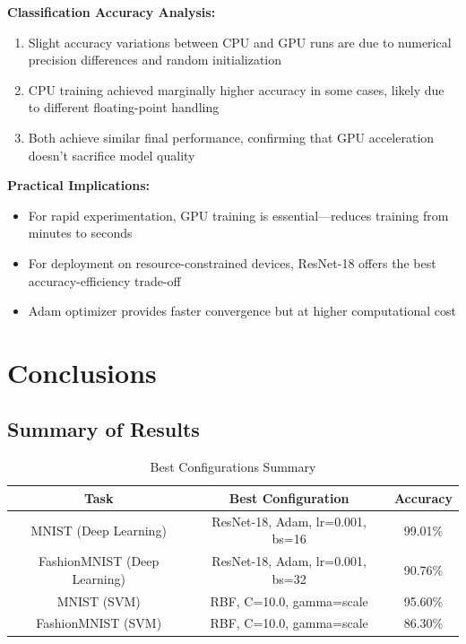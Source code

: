 \documentclass[11pt,a4paper]{article}
\begin{document}
\textbf{Classification Accuracy Analysis:}

\begin{enumerate}
    \item Slight accuracy variations between CPU and GPU runs are due to numerical precision differences and random initialization
    \item CPU training achieved marginally higher accuracy in some cases, likely due to different floating-point handling
    \item Both achieve similar final performance, confirming that GPU acceleration doesn't sacrifice model quality
\end{enumerate}

\textbf{Practical Implications:}

\begin{itemize}
    \item For rapid experimentation, GPU training is essential—reduces training from minutes to seconds
    \item For deployment on resource-constrained devices, ResNet-18 offers the best accuracy-efficiency trade-off
    \item Adam optimizer provides faster convergence but at higher computational cost
\end{itemize}

\section{Conclusions}

\subsection{Summary of Results}

\begin{table}[H]
\centering
\caption{Best Configurations Summary}
\begin{tabular}{|c|c|c|}
\hline
\textbf{Task} & \textbf{Best Configuration} & \textbf{Accuracy} \\
\hline
MNIST (Deep Learning) & ResNet-18, Adam, lr=0.001, bs=16 & 99.01\% \\
\hline
FashionMNIST (Deep Learning) & ResNet-18, Adam, lr=0.001, bs=32 & 90.76\% \\
\hline
MNIST (SVM) & RBF, C=10.0, gamma=scale & 95.60\% \\
\hline
FashionMNIST (SVM) & RBF, C=10.0, gamma=scale & 86.30\% \\
\hline
\end{tabular}
\end{table}
\end{document}
